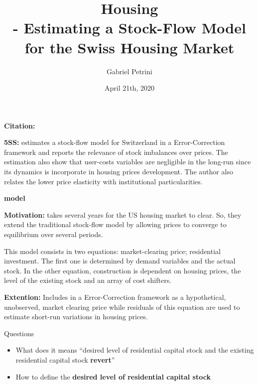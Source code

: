 \documentclass[11pt,lineno]{../_configs}
\title{
\large{Housing}\vspace{2pt}\\
\Huge{\autor - Estimating a Stock-Flow Model for the Swiss Housing Market}
}
\date{April 21th, 2020}
\author[$\ast$]{Gabriel Petrini}
\affil[$\ast$]{PhD Student at Unicamp.}
\newcommand{\autor}{\textcite{steiner_estimating_2010} }
\begin{document}
\maketitle
\articletypemark
\marginmark
\thispagestyle{firststyle}

\noindent \textbf{Citation:} 	

\begin{infobox}
	\textbf{5SS:} \autor estimates a stock-flow model for Switzerland in a Error-Correction framework and reports the relevance of stock imbalances over prices. The estimation also show that user-costs variables are negligible in the long-run since its dynamics is incorporate in housing prices development. The author also relates the lower price elasticity with institutional particularities.
\end{infobox}

\begin{infobox}
\textbf{\Large{\textcite{dipasquale_housing_1994} model}}

\textbf{Motivation:} takes several years for the US housing market to clear. So, they extend the traditional stock-flow model by allowing prices to converge to
equilibrium over several periods.

This model consists in two equations: market-clearing price; residential investment. The first one is determined by demand variables and the actual stock. In the other equation, construction is dependent on housing prices, the level of the existing stock and an array of cost shifters.

\textbf{\textcite{mccarthy_monetary_2002} Extention:} Includes \textcite{dipasquale_housing_1994} in a Error-Correction framework as a hypothetical, unobserved, market clearing price while residuals of this equation are used to estimate short-run variations in housing prices.
\end{infobox}

\begin{redbox}{Questions}
	\begin{itemize}
		\item What does it means ``desired level of residential capital stock and the existing residential capital stock \textbf{revert}''
		\item How to define the \textbf{desired level of residential capital stock}
	\end{itemize}
\end{redbox}
\end{document}
